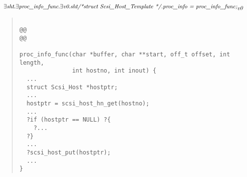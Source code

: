 \documentclass{article}
\newcommand{\mita}[1]{\mbox{\it{{#1}}}}
\begin{document}
\[\begin{array}{l}
\exists \mita{sht} . \exists \mita{proc\_info\_func} . \exists \mita{v0} . \mita{sht/*struct Scsi\_Host\_Template */.proc\_info = proc\_info\_func;}_{\mita{v0}}
\end{array}\]

\begin{quote}\begin{verbatim}

@@
@@

proc_info_func(char *buffer, char **start, off_t offset, int length,
               int hostno, int inout) {
  ...
  struct Scsi_Host *hostptr;
  ...
  hostptr = scsi_host_hn_get(hostno);
  ...
  ?if (hostptr == NULL) ?{
    ?...
  ?}
  ...
  ?scsi_host_put(hostptr);
  ...
}
\end{verbatim}\end{quote}
\end{document}
